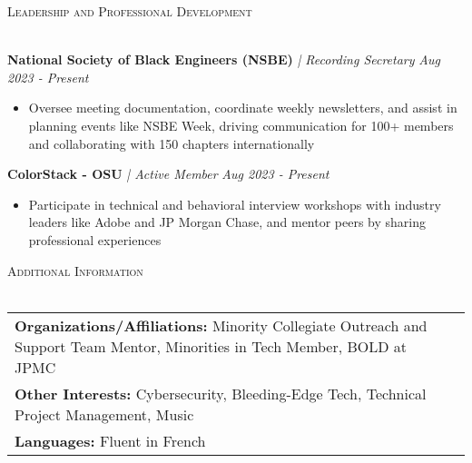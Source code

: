 \documentclass[letterpaper]{article}
\newcommand{\lineunder} {
    \vspace*{-8pt} \\
    \hspace*{-18pt} \hrulefill \\
}
\newcommand{\header} [1] {
    {\hspace*{-18pt}\vspace*{6pt} \textsc{#1}}
    \vspace*{-6pt} \lineunder
}
\begin{document}
\header{Leadership and Professional Development}
\vspace{1mm}

    \textbf{National Society of Black Engineers (NSBE)} \textit{| Recording Secretary} \hfill \textsl{Aug 2023 - Present}\\
    \vspace{-2mm}
    \begin{itemize} \itemsep -1mm
    
        \item Oversee meeting documentation, coordinate weekly newsletters, and assist in planning events like NSBE Week, driving communication for 100+ members and collaborating with 150 chapters internationally
        
    \end{itemize}
    \vspace{-1mm}

    \textbf{ColorStack - OSU} \textit{| Active Member} \hfill \textsl{Aug 2023 - Present}\\
    \vspace{-2mm}
    \begin{itemize} \itemsep -1mm
    
        \item Participate in technical and behavioral interview workshops with industry leaders like Adobe and JP Morgan Chase, and mentor peers by sharing professional experiences
        
    \end{itemize}
    \vspace{-1mm}

\header{Additional Information}
\vspace{1.5mm}
\hspace{-3mm}
\begin{tabular}{ l l }

    \textbf{Organizations/Affiliations:} Minority Collegiate Outreach and Support Team Mentor, Minorities in Tech Member, BOLD at JPMC \\

    \textbf{Other Interests:} Cybersecurity, Bleeding-Edge Tech, Technical Project Management, Music \\

    \textbf{Languages:} Fluent in French \\

\end{tabular}
\vspace{2mm}
\end{document}

